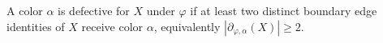 \begin{definition}
A color $\alpha$ is defective for $X$ under $\varphi$ if at least two
distinct boundary edge identities of $X$ receive color $\alpha$, equivalently
$|\partial_{\varphi,\alpha}(X)|\geq2$.
\end{definition}
